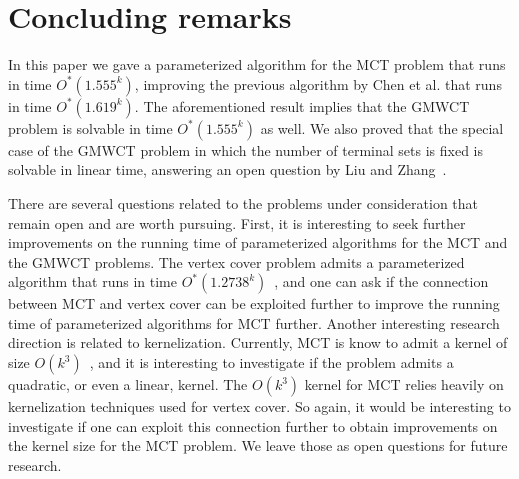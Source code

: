 \documentclass[11pt]{article}
\begin{document}
\section{Concluding remarks}
\label{sec:conclusion}
In this paper we gave a parameterized algorithm for the {\sc MCT} problem that runs in time $O^*(1.555^k)$, improving the previous algorithm by Chen et al. that runs in time $O^{*}(1.619^k)$. The aforementioned result implies that the {\sc GMWCT} problem is solvable in time $O^*(1.555^k)$ as well. We also proved that the special case of the {\sc GMWCT} problem in which the number of terminal sets is fixed is solvable in linear time, answering an open question by Liu and Zhang~\cite{LZ12}.

There are several questions related to the problems under consideration that remain open and are worth pursuing. First, it is interesting to seek further improvements on the running time of parameterized algorithms for the {\sc MCT} and the {\sc GMWCT} problems. The {\sc vertex cover} problem admits a parameterized algorithm that runs in time $O^*(1.2738^k)$~\cite{ckj}, and one can ask if the connection between {\sc MCT} and {\sc vertex cover} can be exploited further to improve the running time of parameterized algorithms for {\sc MCT} further. Another interesting research direction is related to kernelization. Currently, {\sc MCT} is know to admit a kernel of size $O(k^3)$~\cite{multicut}, and it is interesting to investigate if the problem admits a quadratic, or even a linear, kernel. The $O(k^3)$ kernel for {\sc MCT} relies heavily on kernelization techniques used for {\sc vertex cover}. So again, it would be interesting to investigate if one can exploit this connection further to obtain improvements on the kernel size for the {\sc MCT} problem. We leave those as open questions for future research.




\end{document}
